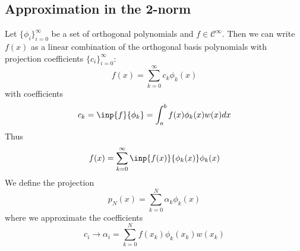 \documentclass[12pt]{article}
\theoremstyle{definition}
\theoremstyle{definition}
\begin{document}
\subsection{Approximation in the 2-norm}
Let $\{\phi_i\}_{i=0}^\infty$ be a set of orthogonal polynomials and $f \in \mathcal{C}^\infty$. Then we can write $f(x)$ as a linear combination of the orthogonal basis polynomials with projection coefficients $\{c_i\}_{i=0}^\infty$:
\begin{equation}
	f(x) = \sum_{k=0}^\infty c_k \phi_k(x)
\end{equation}
with coefficients
\begin{equation}
	c_k = \inp{f}{\phi_k} = \int_a^b f(x)\phi_k(x) w(x) dx
\end{equation}
Thus
\begin{equation}
	f(x) = \sum_{k=0}^\infty \inp{f(x)}{\phi_k(x)} \phi_k(x)
\end{equation}
We define the projection
\begin{equation}
	p_N(x) = \sum_{k=0}^N \alpha_k \phi_k(x)
\end{equation}
where we approximate the coefficients
\begin{equation}
	c_i \to \alpha_i = \sum_{k=0}^N f(x_k)\phi_k(x_k) w(x_k)
\end{equation}
\end{document}
